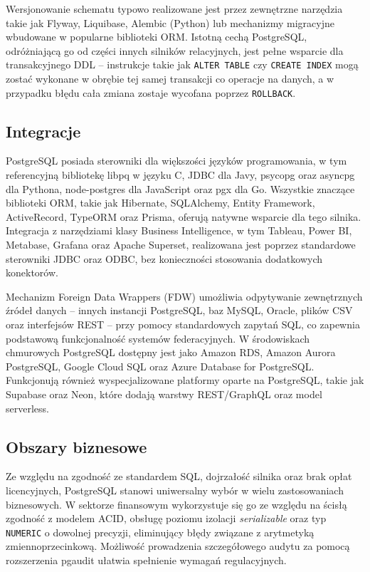 Wersjonowanie schematu typowo realizowane jest przez zewnętrzne narzędzia
takie jak Flyway, Liquibase, Alembic (Python) lub mechanizmy migracyjne
wbudowane w popularne biblioteki ORM. Istotną cechą PostgreSQL, odróżniającą
go od części innych silników relacyjnych, jest pełne wsparcie dla
transakcyjnego DDL -- instrukcje takie jak \texttt{ALTER TABLE} czy
\texttt{CREATE INDEX} mogą zostać wykonane w obrębie tej samej transakcji
co operacje na danych, a w przypadku błędu cała zmiana zostaje wycofana
poprzez \texttt{ROLLBACK}.

\subsection{Integracje}

PostgreSQL posiada sterowniki dla większości języków programowania, w tym
referencyjną bibliotekę libpq w języku C, JDBC dla Javy, psycopg oraz asyncpg
dla Pythona, node-postgres dla JavaScript oraz pgx dla Go. Wszystkie znaczące
biblioteki ORM, takie jak Hibernate, SQLAlchemy, Entity Framework, ActiveRecord,
TypeORM oraz Prisma, oferują natywne wsparcie dla tego silnika. Integracja
z narzędziami klasy Business Intelligence, w tym Tableau, Power BI, Metabase,
Grafana oraz Apache Superset, realizowana jest poprzez standardowe sterowniki
JDBC oraz ODBC, bez konieczności stosowania dodatkowych konektorów.

Mechanizm Foreign Data Wrappers (FDW) umożliwia odpytywanie zewnętrznych
źródeł danych -- innych instancji PostgreSQL, baz MySQL, Oracle, plików CSV
oraz interfejsów REST -- przy pomocy standardowych zapytań SQL, co zapewnia
podstawową funkcjonalność systemów federacyjnych. W środowiskach chmurowych
PostgreSQL dostępny jest jako Amazon RDS, Amazon Aurora PostgreSQL, Google
Cloud SQL oraz Azure Database for PostgreSQL. Funkcjonują również wyspecjalizowane
platformy oparte na PostgreSQL, takie jak Supabase oraz Neon, które dodają
warstwy REST/GraphQL oraz model serverless.

\subsection{Obszary biznesowe}

Ze względu na zgodność ze standardem SQL, dojrzałość silnika oraz brak opłat
licencyjnych, PostgreSQL stanowi uniwersalny wybór w wielu zastosowaniach
biznesowych. W sektorze finansowym wykorzystuje się go ze względu na ścisłą
zgodność z modelem ACID, obsługę poziomu izolacji \textit{serializable} oraz
typ \texttt{NUMERIC} o dowolnej precyzji, eliminujący błędy związane z
arytmetyką zmiennoprzecinkową. Możliwość prowadzenia szczegółowego audytu
za pomocą rozszerzenia pgaudit ułatwia spełnienie wymagań regulacyjnych.

